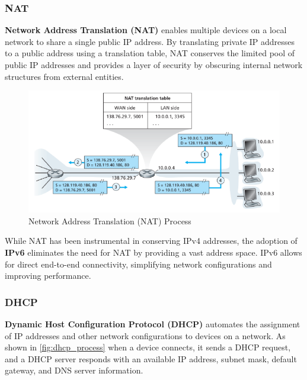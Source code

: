 \subsubsection{NAT}
\label{nat}

\textbf{Network Address Translation (NAT)} enables multiple devices on a local network to share a single public IP address. By translating private IP addresses to a public address using a translation table, NAT conserves the limited pool of public IP addresses and provides a layer of security by obscuring internal network structures from external entities.

\begin{figure}[H]
    \centering
    \includegraphics[scale=0.4]{assets/nat.png}
    \caption{Network Address Translation (NAT) Process}
    \label{fig:nat_process}
\end{figure}

\begin{observationblock}
    While NAT has been instrumental in conserving IPv4 addresses, the adoption of \textbf{IPv6} eliminates the need for NAT by providing a vast address space. IPv6 allows for direct end-to-end connectivity, simplifying network configurations and improving performance.
\end{observationblock}

\subsubsection{DHCP}
\label{dhcp}

\textbf{Dynamic Host Configuration Protocol (DHCP)} automates the assignment of IP addresses and other network configurations to devices on a network. As shown in \cref{fig:dhcp_process} when a device connects, it sends a DHCP request, and a DHCP server responds with an available IP address, subnet mask, default gateway, and DNS server information.


